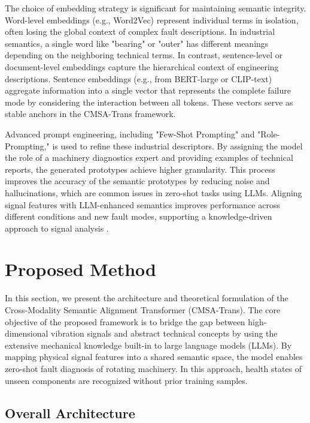 \documentclass[journal]{IEEEtran}
\begin{document}
The choice of embedding strategy is significant for maintaining semantic integrity. Word-level embeddings (e.g., Word2Vec) represent individual terms in isolation, often losing the global context of complex fault descriptions. In industrial semantics, a single word like "bearing" or "outer" has different meanings depending on the neighboring technical terms. In contrast, sentence-level or document-level embeddings capture the hierarchical context of engineering descriptions. Sentence embeddings (e.g., from BERT-large or CLIP-text) aggregate information into a single vector that represents the complete failure mode by considering the interaction between all tokens. These vectors serve as stable anchors in the CMSA-Trans framework.

Advanced prompt engineering, including "Few-Shot Prompting" and "Role-Prompting," is used to refine these industrial descriptors. By assigning the model the role of a machinery diagnostics expert and providing examples of technical reports, the generated prototypes achieve higher granularity. This process improves the accuracy of the semantic prototypes by reducing noise and hallucinations, which are common issues in zero-shot tasks using LLMs. Aligning signal features with LLM-enhanced semantics improves performance across different conditions and new fault modes, supporting a knowledge-driven approach to signal analysis \cite{brown2020language, devlin2018bert, li2024industrial}.


\section{Proposed Method}
\label{sec:method}

In this section, we present the architecture and theoretical formulation of the Cross-Modality Semantic Alignment Transformer (CMSA-Trans). The core objective of the proposed framework is to bridge the gap between high-dimensional vibration signals and abstract technical concepts by using the extensive mechanical knowledge built-in to large language models (LLMs). By mapping physical signal features into a shared semantic space, the model enables zero-shot fault diagnosis of rotating machinery. In this approach, health states of unseen components are recognized without prior training samples.

\subsection{Overall Architecture}
\end{document}
